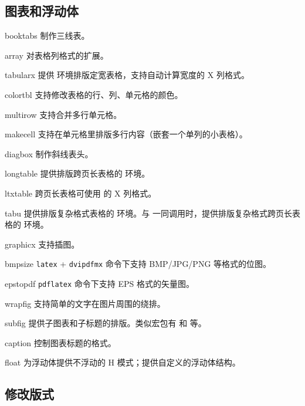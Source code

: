 \subsection{图表和浮动体}\label{subsec:pkg-tab-fig}

\begin{pkglist}
  \item[booktabs]  制作三线表。
  \item[array]    对表格列格式的扩展。
  \item[tabularx] 提供  环境排版定宽表格，支持自动计算宽度的 X 列格式。
  \item[colortbl] 支持修改表格的行、列、单元格的颜色。
  \item[multirow] 支持合并多行单元格。
  \item[makecell] 支持在单元格里排版多行内容（嵌套一个单列的小表格）。
  \item[diagbox]  制作斜线表头。
  \item[longtable] 提供排版跨页长表格的  环境。
  \item[ltxtable] 跨页长表格可使用  的 X 列格式。
  \item[tabu]     提供排版复杂格式表格的  环境。与  一同调用时，提供排版复杂格式跨页长表格的  环境。
  \item[graphicx] 支持插图。
  \item[bmpsize]  \texttt{latex} + \texttt{dvipdfmx} 命令下支持 BMP/JPG/PNG 等格式的位图。
  \item[epstopdf] \texttt{pdflatex} 命令下支持 EPS 格式的矢量图。
  \item[wrapfig]  支持简单的文字在图片周围的绕排。
  \item[subfig]   提供子图表和子标题的排版。类似宏包有  和  等。
  \item[caption]  控制图表标题的格式。
  \item[float]    为浮动体提供不浮动的 H 模式；提供自定义的浮动体结构。
\end{pkglist}

\subsection{修改版式}\label{subsec:pkg-layout}

